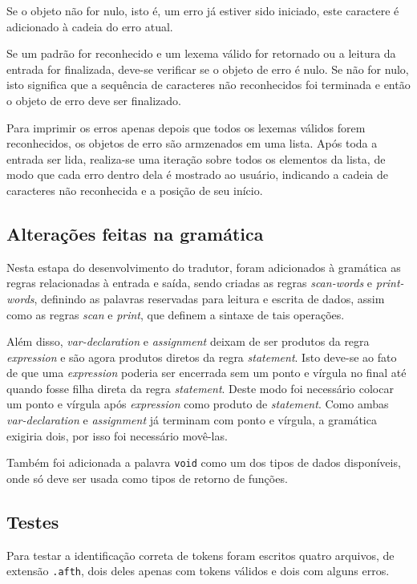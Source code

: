 \documentclass[
	article,			%
	11pt,				%
	oneside,			%
	a4paper,			%
	english,			%
	brazil,				%
	sumario=tradicional
	]{abntex2}
\begin{document}
Se o objeto não for nulo, isto é, um erro já estiver sido iniciado,
este caractere é adicionado à cadeia do erro atual.

Se um padrão for reconhecido e um lexema válido for retornado
ou a leitura da entrada for finalizada, deve-se verificar se o objeto
de erro é nulo. Se não for nulo, isto significa que a sequência
de caracteres não reconhecidos foi terminada e então o objeto de
erro deve ser finalizado.

Para imprimir os erros apenas depois que todos os lexemas válidos
forem reconhecidos, os objetos de erro são armzenados em uma lista.
Após toda a entrada ser lida, realiza-se uma iteração sobre todos
os elementos da lista, de modo que cada erro dentro dela é mostrado
ao usuário, indicando a cadeia de caracteres não reconhecida e a
posição de seu início.

\subsection{Alterações feitas na gramática}

Nesta estapa do desenvolvimento do tradutor, foram adicionados
à gramática as regras relacionadas à entrada e saída, sendo criadas
as regras \textit{scan-words} e \textit{print-words}, definindo
as palavras reservadas para leitura e escrita de dados, assim como
as regras \textit{scan} e \textit{print}, que definem a sintaxe
de tais operações.

Além disso, \textit{var-declaration} e \textit{assignment} deixam
de ser produtos da regra \textit{expression} e são agora produtos
diretos da regra \textit{statement}. Isto deve-se ao fato de que
uma \textit{expression} poderia ser encerrada sem um ponto e vírgula
no final até quando fosse filha direta da regra \textit{statement}.
Deste modo foi necessário colocar um ponto e vírgula após \textit{expression}
como produto de \textit{statement}. Como ambas \textit{var-declaration}
e \textit{assignment} já terminam com ponto e vírgula, a gramática
exigiria dois, por isso foi necessário movê-las.

Também foi adicionada a palavra \texttt{void} como um dos tipos
de dados disponíveis, onde só deve ser usada como tipos de retorno
de funções.

\subsection{Testes}

Para testar a identificação correta de tokens foram escritos quatro
arquivos, de extensão \texttt{.afth}, dois deles apenas com tokens
válidos e dois com alguns erros.
\end{document}
